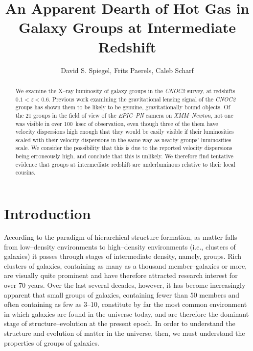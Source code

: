 \documentclass[12pt,preprint]{aastex}
\begin{document}

\title{An Apparent Dearth of Hot Gas in Galaxy Groups at Intermediate Redshift}

\author{David S. Spiegel, Frits Paerels,
Caleb Scharf}


\vspace{0.5\baselineskip}




\begin{abstract}
We examine the X--ray luminosity of galaxy groups in the \textsl{CNOC2} survey,
at redshifts $0.1 < z < 0.6$.  Previous work examining the gravitational
lensing signal of the \textsl{CNOC2} groups has shown them to be likely to be
genuine, gravitationally bound objects.  Of the 21 groups in the field of view
of the \textsl{EPIC--PN} camera on \textsl{XMM--Newton}, not one was visible
in over 100~ksec of observation, even though three of the them have velocity
dispersions high enough that they would be easily visible if their luminosities
scaled with their velocity dispersions in the same way as nearby groups'
luminosities scale.  We consider the possibility that this is due to
the reported velocity dispersions being erroneously high, and conclude that
this is unlikely.  We therefore find tentative evidence that groups at
intermediate redshift are underluminous relative to their local cousins.
\end{abstract}



\section{Introduction}
\label{sec:intro}
According to the paradigm of hierarchical structure formation, 
as matter falls from low--density environments to high--density environments
(i.e., clusters of galaxies) it passes through stages of intermediate density,
namely, groups.  Rich clusters of galaxies, containing as many as a thousand
member--galaxies or more, are visually quite prominent and have therefore
attracted research interest for over 70 years.  Over the last several decades,
however, it has become increasingly apparent that small groups of galaxies,
containing fewer than 50 members and often containing as few as 3--10,
constitute by far the most common environment in which galaxies are found in
the universe today, and are therefore the dominant stage of
structure--evolution at the present epoch.  In order to understand the
structure and evolution of matter in the universe, then, we must understand the
properties of groups of galaxies.
\end{document}
